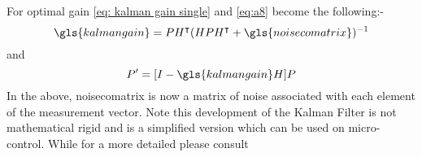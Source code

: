 For optimal gain \eqref{eq: kalman gain single} and \eqref{eq:a8} become the following:-
\begin{equation}
\gls{kalmangain} = PH^\intercal(HPH^\intercal + \gls{noisecomatrix})^{-1}
\end{equation}
and
\begin{equation}
P' = [I-\gls{kalmangain}H]P
\end{equation}
In the above, \gls{noisecomatrix} is now a matrix of noise associated with each element of the measurement vector. Note this development of the Kalman Filter is not mathematical rigid and is a simplified version which can be used on micro-control. While for a more detailed please consult \cite{An_Introduction_to_the_Kalman_Filter,kalman1960new}  